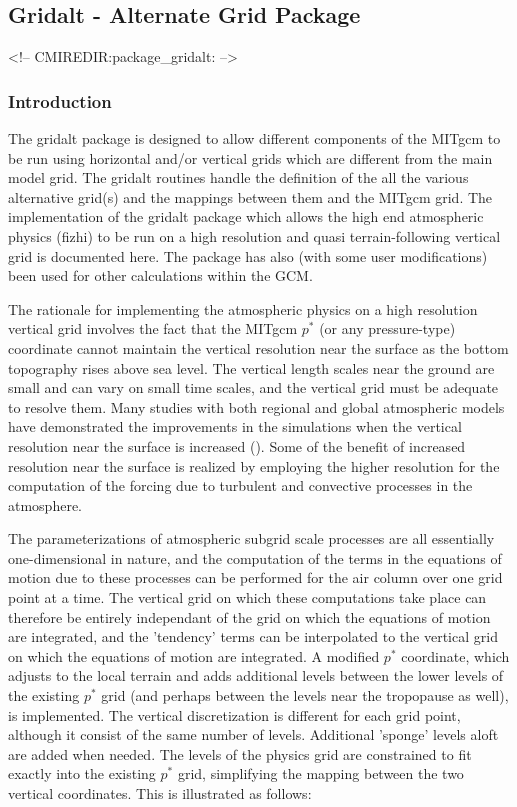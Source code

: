 \subsection{Gridalt - Alternate Grid Package}
\label{sec:pkg:gridalt}
\begin{rawhtml}
<!-- CMIREDIR:package_gridalt: -->
\end{rawhtml}

\subsubsection {Introduction} 

The gridalt package is designed to allow different components of the MITgcm to
be run using horizontal and/or vertical grids which are different from the main 
model grid. The gridalt routines handle the definition of the all the various
alternative grid(s) and the mappings between them and the MITgcm grid.
The implementation of the gridalt package which allows the high end atmospheric 
physics (fizhi) to be run on a high resolution and quasi terrain-following vertical 
grid is documented here.  The package has also (with some user modifications) been used 
for other calculations within the GCM. 

The rationale for implementing the atmospheric physics on a high resolution vertical
grid involves the fact that the MITgcm $p^*$ (or any pressure-type) coordinate cannot 
maintain the vertical resolution near the surface as the bottom topography rises above
sea level. The vertical length scales near the ground are small and can vary 
on small time scales, and the vertical grid must be adequate to resolve them.
Many studies with both regional and global atmospheric models have demonstrated the 
improvements in the simulations when the vertical resolution near the surface is 
increased (\cite{bm:99,Inn:01,wo:98,breth:99}). Some of the benefit of increased resolution 
near the surface is realized by employing the higher resolution for the computation of the 
forcing due to turbulent and convective processes in the atmosphere.  

The parameterizations of atmospheric subgrid scale processes are all essentially
one-dimensional in nature, and the computation of the terms in the equations of
motion due to these processes can be performed for the air column over one grid point 
at a time.  The vertical grid on which these computations take place can therefore be 
entirely independant of the grid on which the equations of motion are integrated, and 
the 'tendency' terms can be interpolated to the vertical grid on which the equations
of motion are integrated. A modified $p^*$ coordinate, which adjusts to the local 
terrain and adds additional levels between the lower levels of the existing $p^*$ grid 
(and perhaps between the levels near the tropopause as well), is implemented. The 
vertical discretization is different for each grid point, although it consist of the 
same number of levels. Additional 'sponge' levels aloft are added when needed. The levels 
of the physics grid are constrained to fit exactly into the existing $p^*$ grid, simplifying 
the mapping between the two vertical coordinates.  This is illustrated as follows:

